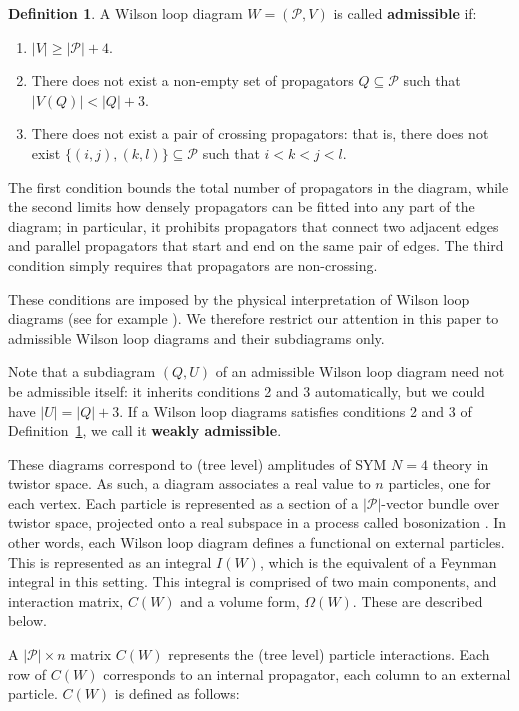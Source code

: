 \documentclass[11pt]{article}
\newcommand{\cP}{\mathcal{P}}
\theoremstyle{remark}
\theoremstyle{definition}
\newtheorem{dfn}[thm]{Definition}
\begin{document}
\begin{dfn}\label{admisdfn}
A Wilson loop diagram $W = (\cP, V)$ is called {\bf admissible} if:
\begin{enumerate}
\item $|V| \geq |\cP| + 4$.
\item There does not exist a non-empty set of propagators $Q \subseteq \cP$ such that $|V(Q)| < |Q| + 3$.
\item There does not exist a pair of crossing propagators: that is, there does not exist $\{(i,j),(k,l)\} \subseteq \cP$ such that $i < k < j < l$.
\end{enumerate}
 \end{dfn}

The first condition bounds the total number of propagators in the diagram, while the second limits how densely propagators can be fitted into any part of the diagram; in particular, it prohibits propagators that connect two adjacent edges and parallel propagators that start and end on the same pair of edges. The third condition simply requires that propagators are non-crossing. 

These conditions are imposed by the physical interpretation of Wilson loop diagrams (see for example \cite{Adamo:2011pv,Adamo:2012xe,wilsonloop,LipsteinMason}). We therefore restrict our attention in this paper to admissible Wilson loop diagrams and their subdiagrams only. 

Note that a subdiagram $(Q,U)$ of an admissible Wilson loop diagram need not be admissible itself: it inherits conditions 2 and 3 automatically, but we could have $|U| = |Q| + 3$. If a Wilson loop diagrams satisfies conditions 2 and 3 of Definition~\ref{admisdfn}, we call it {\bf weakly admissible}.

These diagrams correspond to (tree level) amplitudes of SYM $N=4$ theory in twistor space. As such, a diagram associates a real value to $n$ particles, one for each vertex. Each particle is represented as a section of a $|\cP|$-vector bundle over twistor space, projected onto a real subspace in a process called bosonization \cite{Arkani-Hamed:2013jha}. In other words, each Wilson loop diagram defines a functional on external particles. This is represented as an integral $I(W)$, which is the equivalent of a Feynman integral in this setting. This integral is comprised of two main components, and interaction matrix, $C(W)$ and a volume form, $\Omega(W)$. These are described below.

A $|\cP| \times n$ matrix $C(W)$ represents the (tree level) particle interactions. Each row of $C(W)$ corresponds to an internal propagator, each column to an external particle. $C(W)$ is defined as follows:
\end{document}
